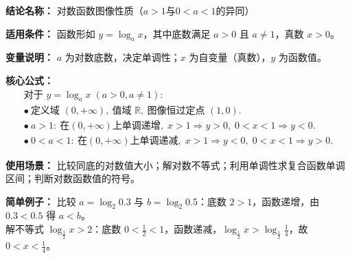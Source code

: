 \textbf{结论名称：} 对数函数图像性质（\(a>1\)与\(0<a<1\)的异同）

\textbf{适用条件：} 函数形如 \(y=\log_a x\)，其中底数满足 \(a>0\) 且 \(a\neq 1\)，真数 \(x>0\)。

\textbf{变量说明：} \(a\) 为对数底数，决定单调性；\(x\) 为自变量（真数），\(y\) 为函数值。

\textbf{核心公式：}
\[
\boxed{\begin{array}{l}
\text{对于 }y=\log_a x\;(a>0,a\neq 1):\\
\bullet\ \text{定义域 }(0,+\infty),\ \text{值域 }\mathbb{R},\ \text{图像恒过定点 }(1,0).\\
\bullet\ a>1:\ \text{在}(0,+\infty)\text{上单调递增},\;
x>1\Rightarrow y>0,\;0<x<1\Rightarrow y<0.\\
\bullet\ 0<a<1:\ \text{在}(0,+\infty)\text{上单调递减},\;
x>1\Rightarrow y<0,\;0<x<1\Rightarrow y>0.
\end{array}}
\]

\textbf{使用场景：} 比较同底的对数值大小；解对数不等式；利用单调性求复合函数单调区间；判断对数函数值的符号。

\textbf{简单例子：} 
比较 \(a=\log_2 0.3\) 与 \(b=\log_2 0.5\)：底数 \(2>1\)，函数递增，由 \(0.3<0.5\) 得 \(a<b\)。\\
解不等式 \(\log_{\frac12}x > 2\)：底数 \(0<\frac12<1\)，函数递减，\(\log_{\frac12}x > \log_{\frac12}\frac14\)，故 \(0<x<\frac14\)。